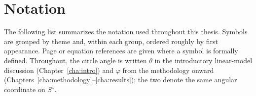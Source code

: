 %
%
%      
%

\chapter*{Notation}

The following list summarizes the notation used throughout this thesis. Symbols
are grouped by theme and, within each group, ordered roughly by first
appearance. Page or equation references are given where a symbol is formally
defined. Throughout, the circle angle is written $\theta$ in the introductory
linear-model discussion (Chapter~\ref{cha:intro}) and $\varphi$ from the
methodology onward (Chapters~\ref{cha:methodology}--\ref{cha:results}); the two
denote the same angular coordinate on $S^1$.

\vspace{1em}

